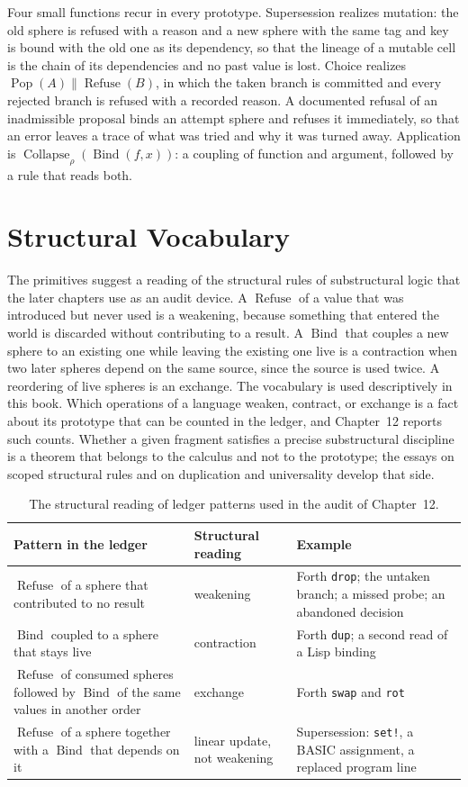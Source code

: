 \documentclass[11pt,oneside]{report}
\newcommand{\Pop}{\operatorname{Pop}}
\newcommand{\Refuse}{\operatorname{Refuse}}
\newcommand{\Bind}{\operatorname{Bind}}
\newcommand{\Collapse}{\operatorname{Collapse}}
\theoremstyle{plain}
\theoremstyle{definition}
\theoremstyle{remark}
\newcommand{\code}[2][Python]{}
\begin{document}
Four small functions recur in every prototype. Supersession realizes mutation: the old sphere is refused with a reason and a new sphere with the same tag and key is bound with the old one as its dependency, so that the lineage of a mutable cell is the chain of its dependencies and no past value is lost. Choice realizes $\Pop(A)\parallel\Refuse(B)$, in which the taken branch is committed and every rejected branch is refused with a recorded reason. A documented refusal of an inadmissible proposal binds an attempt sphere and refuses it immediately, so that an error leaves a trace of what was tried and why it was turned away. Application is $\Collapse_\rho(\Bind(f,x))$: a coupling of function and argument, followed by a rule that reads both.

\code{ex_kernel_derived}

\section{Structural Vocabulary}

The primitives suggest a reading of the structural rules of substructural logic that the later chapters use as an audit device. A $\Refuse$ of a value that was introduced but never used is a weakening, because something that entered the world is discarded without contributing to a result. A $\Bind$ that couples a new sphere to an existing one while leaving the existing one live is a contraction when two later spheres depend on the same source, since the source is used twice. A reordering of live spheres is an exchange. The vocabulary is used descriptively in this book. Which operations of a language weaken, contract, or exchange is a fact about its prototype that can be counted in the ledger, and Chapter~12 reports such counts. Whether a given fragment satisfies a precise substructural discipline is a theorem that belongs to the calculus and not to the prototype; the essays on scoped structural rules and on duplication and universality \cite{flyxion-scoped,flyxion-duplication} develop that side.

\begin{table}[H]
\centering
\begin{tabular}{p{4.6cm}p{3.1cm}p{5.6cm}}
\toprule
Pattern in the ledger & Structural reading & Example\\
\midrule
$\Refuse$ of a sphere that contributed to no result & weakening & Forth \texttt{drop}; the untaken branch; a missed probe; an abandoned decision\\
$\Bind$ coupled to a sphere that stays live & contraction & Forth \texttt{dup}; a second read of a Lisp binding\\
$\Refuse$ of consumed spheres followed by $\Bind$ of the same values in another order & exchange & Forth \texttt{swap} and \texttt{rot}\\
$\Refuse$ of a sphere together with a $\Bind$ that depends on it & linear update, not weakening & Supersession: \texttt{set!}, a BASIC assignment, a replaced program line\\
\bottomrule
\end{tabular}
\caption{The structural reading of ledger patterns used in the audit of Chapter~12.}
\end{table}
\end{document}
